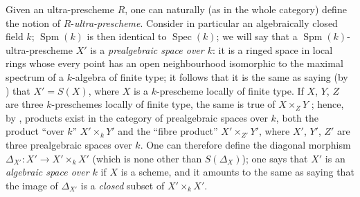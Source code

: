 \begin{env}[10.10.2]
\label{IV.10.10.2}
Given an ultra-prescheme $R$, one can naturally (as in the whole category) define the notion of $R$-\emph{ultra-prescheme}.
Consider in particular an algebraically closed field $k$; $\operatorname{Spm}(k)$ is then identical to $\operatorname{Spec}(k)$; we will say that a $\operatorname{Spm}(k)$-ultra-prescheme $X'$ is a \emph{prealgebraic space over $k$}: it is a ringed space in local rings whose every point has an open neighbourhood isomorphic to the maximal spectrum of a $k$-algebra of finite type; it follows that it is the same as saying (by ) that $X'=S(X)$, where $X$ is a $k$-prescheme locally of finite type.
If $X$, $Y$, $Z$ are three $k$-preschemes locally of finite type, the same is true of $X\times_ZY$ ; hence, by , products exist in the category of prealgebraic spaces over $k$, both the product ``over $k$'' $X'\times_kY'$ and the ``fibre product'' $X'\times_{Z'}Y'$, where $X'$, $Y'$, $Z'$ are three prealgebraic spaces over $k$.
One can therefore define the diagonal morphism $\Delta_{X'}:X'\to X'\times_k X'$ (which is none other than $S(\Delta_X)$); one says that $X'$ is an \emph{algebraic space over $k$} if $X$ is a scheme, and it amounts to the same as saying that the image of $\Delta_{X'}$ is a \emph{closed} subset of $X'\times_k X'$.
\end{env}

